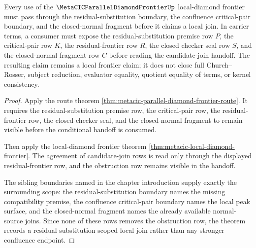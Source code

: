 \begin{theorem}
\label{thm:metacic-parallel-diamond-frontier-residual-substitution-scope}
Every use of the $\MetaCICParallelDiamondFrontierUp$ local-diamond frontier must pass through the residual-substitution boundary, the confluence critical-pair boundary, and the closed-normal fragment before it claims a local join. In carrier terms, a consumer must expose the residual-substitution premise row $P$, the critical-pair row $K$, the residual-frontier row $R$, the closed checker seal row $S$, and the closed-normal fragment row $C$ before reading the candidate-join handoff. The resulting claim remains a local frontier claim; it does not close full Church--Rosser, subject reduction, evaluator equality, quotient equality of terms, or kernel consistency.
\end{theorem}
\begin{proof}
Apply the route theorem \autoref{thm:metacic-parallel-diamond-frontier-route}. It requires the residual-substitution premise row, the critical-pair row, the residual-frontier row, the closed-checker seal, and the closed-normal fragment to remain visible before the conditional handoff is consumed.

Then apply the local-diamond frontier theorem \autoref{thm:metacic-local-diamond-frontier}. The agreement of candidate-join rows is read only through the displayed residual-frontier row, and the obstruction row remains visible in the handoff.

The sibling boundaries named in the chapter introduction supply exactly the surrounding scope: the residual-substitution boundary names the missing compatibility premise, the confluence critical-pair boundary names the local peak surface, and the closed-normal fragment names the already available normal-source joins. Since none of these rows removes the obstruction row, the theorem records a residual-substitution-scoped local join rather than any stronger confluence endpoint.
\end{proof}

